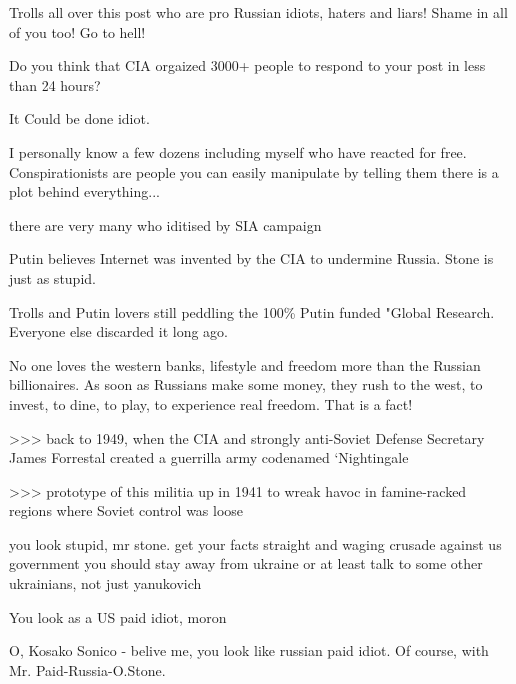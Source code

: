 \begin{itemize}
\begin{itemize} %
Trolls all over this post who are pro Russian idiots, haters and liars! Shame in all of you too! Go to hell!
\end{itemize} %


Do you think that CIA orgaized 3000+ people to respond to your post in less
than 24 hours?

\begin{itemize} %
It Could be done idiot.


I personally know a few dozens including myself who have reacted for free.
Conspirationists are people you can easily manipulate by telling them there is
a plot behind everything...


there are very many who iditised
by SIA campaign

Putin believes Internet was invented by the CIA to undermine Russia. Stone is just as stupid.

Trolls and Putin lovers still peddling the 100\% Putin funded "Global Research. Everyone else discarded it long ago.


No one loves the western banks, lifestyle and freedom more than the Russian
billionaires. As soon as Russians make some money, they rush to the west, to
invest, to dine, to play, to experience real freedom. That is a fact!

\end{itemize} %


>>> back to 1949, when the CIA and strongly anti-Soviet Defense Secretary James
Forrestal created a guerrilla army codenamed ‘Nightingale

>>> prototype of this militia up in 1941 to wreak havoc in famine-racked
regions where Soviet control was loose

you look stupid, mr stone. get your facts straight and waging crusade against
us government you should stay away from ukraine or at least talk to some other
ukrainians, not just yanukovich

\begin{itemize} %
You look as a US paid idiot, moron

O, Kosako Sonico - belive me, you look like russian paid idiot. Of course, with Mr. Paid-Russia-O.Stone.
\end{itemize} %


\end{itemize}
